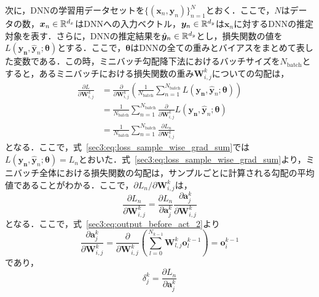 \documentclass[12pt]{jarticle}
\numberwithin{equation}{section}    %
\numberwithin{figure}{section}      %
\numberwithin{table}{section}      %
\begin{document}
次に，DNNの学習用データセットを$\{(\bm{x}_{n}, \bm{y}_{n})\}_{n = 1}^{N}$とおく．ここで，$N$はデータの数，$\bm{x}_{n} \in \mathbb{R}^{d_{x}}$はDNNへの入力ベクトル，$\bm{y}_{n} \in \mathbb{R}^{d_{y}}$は$\bm{x}_{n}$に対するDNNの推定対象を表す．さらに，DNNの推定結果を$\hat{\bm{y}}_{n} \in \mathbb{R}^{d_{y}}$とし，損失関数の値を$L(\bm{y_{n}}, \hat{\bm{y}}_{n} ; \bm{\theta})$とする．ここで，$\bm{\theta}$はDNNの全ての重みとバイアスをまとめて表した変数である．この時，ミニバッチ勾配降下法におけるバッチサイズを$N_{\text{batch}}$とすると，あるミニバッチにおける損失関数の重み$\bm{W}_{i, j}^{k}$についての勾配は，
\begin{align}
    \frac{\partial L}{\partial \bm{W}_{i, j}^{k}} & = \frac{\partial}{\partial \bm{W}_{i, j}^{k}} \left(\frac{1}{N_{\text{batch}}} \sum_{n = 1}^{N_{\text{batch}}} L(\bm{y_{n}}, \hat{\bm{y}}_{n}; \bm{\theta})\right) \\
                                                  & = \frac{1}{N_{\text{batch}}} \sum_{n = 1}^{N_{\text{batch}}} \frac{\partial}{\partial \bm{W}_{i, j}^{k}} L(\bm{y_{n}}, \hat{\bm{y}}_{n}; \bm{\theta})              \\
                                                  & = \frac{1}{N_{\text{batch}}} \sum_{n = 1}^{N_{\text{batch}}} \frac{\partial L_{n}}{\partial \bm{W}_{i, j}^{k}} \label{sec3:eq:loss_sample_wise_grad_sum}
\end{align}
となる．ここで，式~\eqref{sec3:eq:loss_sample_wise_grad_sum}では$L(\bm{y_{n}}, \hat{\bm{y}}_{n}; \bm{\theta}) = L_{n}$とおいた．式~\eqref{sec3:eq:loss_sample_wise_grad_sum}より，ミニバッチ全体における損失関数の勾配は，サンプルごとに計算される勾配の平均値であることがわかる．ここで，$\partial L_{n} / \partial \bm{W}_{i, j}^{k}$は，
\begin{equation}
    \label{sec3:eq:loss_sample_wise_grad}
    \frac{\partial L_{n}}{\partial \bm{W}_{i, j}^{k}} = \frac{\partial L_{n}}{\partial \bm{a}_{j}^{k}} \frac{\partial \bm{a}_{j}^{k}}{\partial \bm{W}_{i, j}^{k}}
\end{equation}
となる．ここで，式~\eqref{sec3:eq:output_before_act_2}より
\begin{equation}
    \frac{\partial \bm{a}_{j}^{k}}{\partial \bm{W}_{i, j}^{k}} = \frac{\partial}{\partial \bm{W}_{i, j}^{k}} \left( \sum_{l = 0}^{N_{k - 1}} \bm{W}_{l, j}^{k} \bm{o}_{l}^{k - 1} \right) = \bm{o}_{i}^{k - 1}
\end{equation}
であり，
\begin{equation}
    \delta_{j}^{k} = \frac{\partial L_{n}}{\partial \bm{a}_{j}^{k}}
\end{equation}
\end{document}
